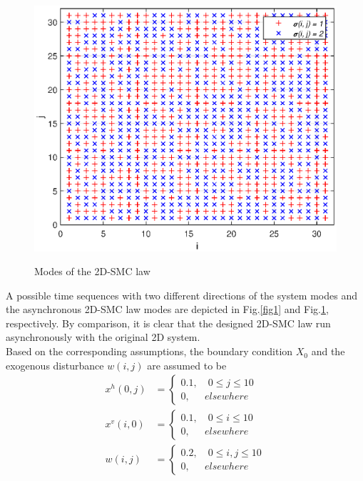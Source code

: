 \documentclass[conference]{IEEEtran}
\begin{document}
\begin{figure}[!htb]
	\centering\includegraphics[scale=0.6]{./simulations/sigma_eps.eps}\\ 
	\caption{Modes of the 2D-SMC law}
	\label{fig2}
\end{figure}
A possible time sequences with two different directions of the system modes and the asynchronous 2D-SMC law modes are depicted in Fig.\ref{fig1} and Fig.\ref{fig2}, respectively. By comparison, it is clear that the designed 2D-SMC law run asynchronously with the original 2D system.  \\
Based on the corresponding assumptions, the boundary condition $X_{0}$ and  the exogenous disturbance $w(i,j)$ are assumed to be
\begin{equation*}
\begin{aligned}
	x^{h}(0, j)&=\begin{cases}
		0.1, \quad 0\leq j \leq 10 \\
		0, \quad \ \ elsewhere
	\end{cases} \\
	x^{v}(i, 0)&=\begin{cases}
	0.1, \quad 0\leq i \leq 10 \\
	0, \quad \ \ elsewhere
	\end{cases}\\
	w(i, j)\ &=\begin{cases}
	0.2, \quad 0\leq i,j \leq 10 \\
	0, \quad \ \ elsewhere
	\end{cases}
\end{aligned}
\end{equation*}
\end{document}
